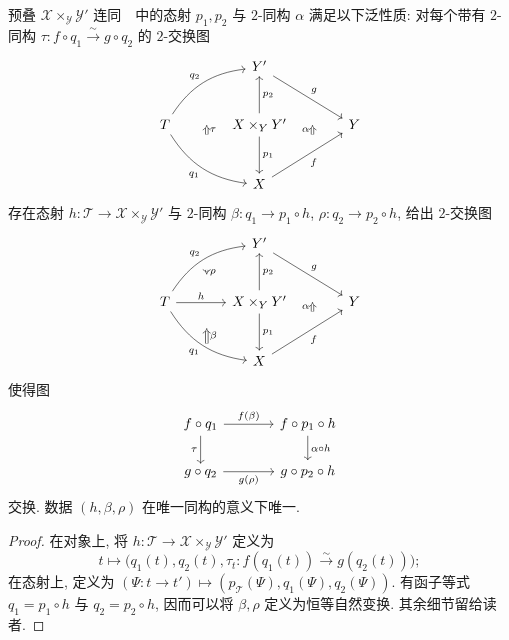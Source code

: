 \begin{theorem}\label{src:3.4.35}
预叠 $\mathcal X\times_{\mathcal Y}\mathcal Y'$ 连同~~中的态射 $p_1,p_2$ 与 $2$-同构 $\alpha$ 满足以下泛性质: 对每个带有 $2$-同构 $\tau:f\circ q_1\xrightarrow{\sim}g\circ q_2$ 的 $2$-交换图
\[
\begin{tikzcd}[column sep=large,row sep=large]
{}&\mathcal Y'\arrow[dr,"g"]&{}\\
\mathcal T\arrow[ur,bend left=25,"q_2"]\arrow[dr,bend right=25,"q_1"']&
\mathcal X\times_{\mathcal Y}\mathcal Y'\arrow[u,"p_2"']\arrow[d,"p_1"]&
\mathcal Y\\
{}&\mathcal X\arrow[ur,"f"']&{}
\arrow[Rightarrow,from=3-1,to=1-1,shorten <=3.5em,shorten >=3.5em,shift right=3em,"\tau"']
\arrow[Rightarrow,from=3-3,to=1-3,shorten <=3.5em,shorten >=3.5em,shift left=3em,"\alpha"]
\end{tikzcd}
\]
存在态射 $h:\mathcal T\to\mathcal X\times_{\mathcal Y}\mathcal Y'$ 与 $2$-同构 $\beta:q_1\to p_1\circ h$, $\rho:q_2\to p_2\circ h$, 给出 $2$-交换图
\[
\begin{tikzcd}[column sep=large,row sep=large]
{}&\mathcal Y'\arrow[dr,"g"]&{}\\
\mathcal T\arrow[r,"h"]\arrow[ur,bend left=25,"q_2"]
\arrow[dr,bend right=25,"q_1"']&
\mathcal X\times_{\mathcal Y}\mathcal Y'\arrow[u,"p_2"']\arrow[d,"p_1"]&
\mathcal Y\\
{}&\mathcal X\arrow[ur,"f"']&{}
\arrow[Rightarrow,from=3-1,to=2-1,shorten <=1.2em,shorten >=1.2em,shift right=3em,"\beta"']
\arrow[Rightarrow,from=1-1,to=2-1,shorten <=1.2em,shorten >=1.2em,shift left=3em,"\rho"]
\arrow[Rightarrow,from=3-3,to=1-3,shorten <=3.5em,shorten >=3.5em,shift left=3em,"\alpha"]
\end{tikzcd}
\]
使得图
\[
\begin{tikzcd}[column sep=large]
f\circ q_1\arrow[r,"f(\beta)"]\arrow[d,"\tau"']&
f\circ p_1\circ h\arrow[d,"\alpha\circ h"]\\
g\circ q_2\arrow[r,"g(\rho)"']&g\circ p_2\circ h
\end{tikzcd}
\]
交换. 数据 $(h,\beta,\rho)$ 在唯一同构的意义下唯一.
\end{theorem}
\begin{proof}
在对象上, 将 $h:\mathcal T\to\mathcal X\times_{\mathcal Y}\mathcal Y'$ 定义为
\[
t\longmapsto\bigl(q_1(t),q_2(t),\tau_t:f(q_1(t))\xrightarrow{\sim}g(q_2(t))\bigr);
\]
在态射上, 定义为 $(\Psi:t\to t')\mapsto(p_{\mathcal T}(\Psi),q_1(\Psi),q_2(\Psi))$. 有函子等式 $q_1=p_1\circ h$ 与 $q_2=p_2\circ h$, 因而可以将 $\beta,\rho$ 定义为恒等自然变换. 其余细节留给读者.
\end{proof}
